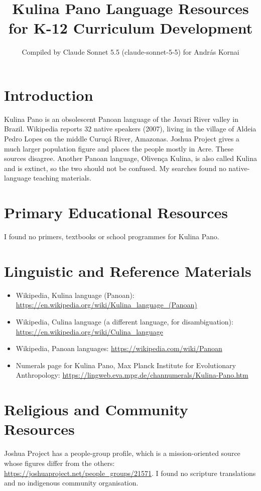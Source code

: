 \documentclass[12pt]{article}
\title{Kulina Pano Language Resources for K-12 Curriculum Development}
\author{Compiled by Claude Sonnet 5.5 (claude-sonnet-5-5) for Andr\'as Kornai}
\date{}
\begin{document}
\maketitle

\section{Introduction}
Kulina Pano is an obsolescent Panoan language of the Javari River valley in Brazil. Wikipedia reports 32 native speakers (2007), living in the village of Aldeia Pedro Lopes on the middle Curu\c{c}\'a River, Amazonas. Joshua Project gives a much larger population figure and places the people mostly in Acre. These sources disagree. Another Panoan language, Olivença Kulina, is also called Kulina and is extinct, so the two should not be confused. My searches found no native-language teaching materials.

\section{Primary Educational Resources}
I found no primers, textbooks or school programmes for Kulina Pano.

\section{Linguistic and Reference Materials}
\begin{itemize}
\item Wikipedia, Kulina language (Panoan): \url{https://en.wikipedia.org/wiki/Kulina_language_(Panoan)}
\item Wikipedia, Culina language (a different language, for disambiguation): \url{https://en.wikipedia.org/wiki/Culina_language}
\item Wikipedia, Panoan languages: \url{https://wikipedia.com/wiki/Panoan}
\item Numerals page for Kulina Pano, Max Planck Institute for Evolutionary Anthropology: \url{https://lingweb.eva.mpg.de/channumerals/Kulina-Pano.htm}
\end{itemize}

\section{Religious and Community Resources}
Joshua Project has a people-group profile, which is a mission-oriented source whose figures differ from the others: \url{https://joshuaproject.net/people_groups/21571}. I found no scripture translations and no indigenous community organisation.
\end{document}
